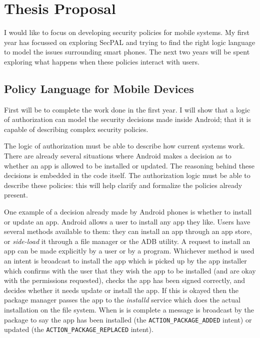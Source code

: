 \documentclass[a4paper]{article}
\begin{document}
\section{Thesis Proposal}

I would like to focus on developing security policies for mobile systems.  My
first year has focussed on exploring SecPAL and trying to find the right logic
language to model the issues surrounding smart phones.  The next two years will
be spent exploring what happens when these policies interact with users.

\subsection{Policy Language for Mobile Devices}
\label{sec:proposallang}

First will be to complete the work done in the first year. I will show that
a logic of authorization can model the security decisions made inside Android;
that it is capable of describing complex security policies. 

The logic of authorization must be able to describe how current systems work.
There are already several situations where Android makes a decision as to
whether an app is allowed to be installed or updated.  The reasoning behind
these decisions is embedded in the code itself.  The authorization logic must be
able to describe these policies: this will help clarify and formalize the
policies already present.

One example of a decision already made by Android phones is whether to install
or update an app.  Android allows a user to install any app they like.  Users
have several methods available to them: they can install an app through an app
store, or \emph{side-load} it through a file manager or the \ac{ADB} utility.  A
request to install an app can be made explicitly by a user or by a program.
Whichever method is used an intent is broadcast to install the app which is
picked up by the app installer which confirms with the user that they wish the
app to be installed (and are okay with the permissions requested), checks the
app has been signed correctly, and decides whether it needs update or install
the app.  If this is okayed then the package manager passes the app to the
\emph{installd} service which does the actual installation on the file system.
When is is complete a message is broadcast by the package to say the app has
been installed (the \texttt{ACTION\_PACKAGE\_ADDED} intent) or updated (the
\texttt{ACTION\_PACKAGE\_REPLACED} intent).
\end{document}
